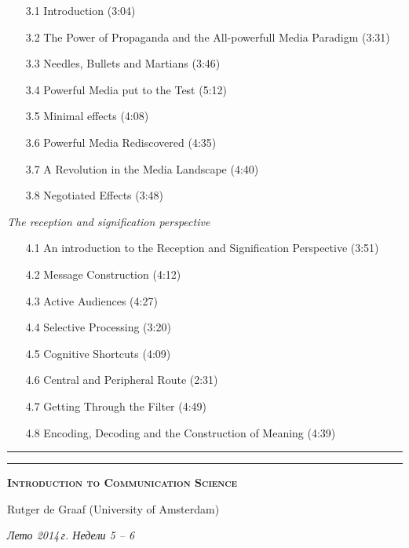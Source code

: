 \documentclass[a4paper]{article}
\begin{document}
{{\begin{description}
\begin{itemize}
\item[3.1] Introduction (3:04)
\item[3.2] The Power of Propaganda and the All-powerfull Media Paradigm (3:31)
\item[3.3] Needles, Bullets and Martians (3:46)
\item[3.4] Powerful Media put to the Test (5:12)
\item[3.5] Minimal effects (4:08)
\item[3.6] Powerful Media Rediscovered (4:35)
\item[3.7] A Revolution in the Media Landscape (4:40)
\item[3.8] Negotiated Effects (3:48)
\end{itemize}
\item[Week 4] \textsl{The reception and signification perspective}
\begin{itemize}
\item[4.1] An introduction to the Reception and Signification Perspective (3:51)
\item[4.2] Message Construction (4:12)
\item[4.3] Active Audiences (4:27)
\item[4.4] Selective Processing (3:20)
\item[4.5] Cognitive Shortcuts (4:09)
\item[4.6] Central and Peripheral Route (2:31)
\item[4.7] Getting Through the Filter (4:49)
\item[4.8] Encoding, Decoding and the Construction of Meaning (4:39)
\end{itemize}
\end{description}}}
\hrule
\newpage

\renewcommand{\hist}{
\begin{center}
\hrule
\medskip

\textbf{\textsc{Introduction to Communication Science}}
\smallskip

{\large\textrm{Rutger de Graaf (University of Amsterdam)}}


\smallskip

\textsl{Лето 2014\,г. Недели 5 -- 6}
\end{center}}

\hist
\end{document}
